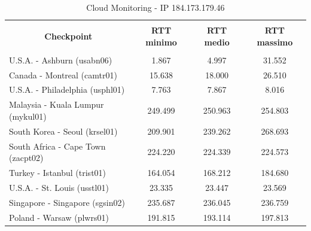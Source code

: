 \documentclass[a4paper,11pt]{book}
\begin{document}
\begin{table}[!ht]
\caption{Cloud Monitoring - IP 184.173.179.46}\label{table:Monitoring_3}
\begin{tabular}{|l|c|c|c|}
\hline
\multicolumn{1}{|c|}{\textbf{}} & {\textbf{}} & {\textbf{}} & {\textbf{}}\\
\multicolumn{1}{|c|}{\textbf{Checkpoint}} & {\textbf{RTT minimo}} & {\textbf{RTT medio}} & {\textbf{RTT massimo}}\\
\multicolumn{1}{|c|}{\textbf{}} & {\textbf{}} & {\textbf{}} & {\textbf{}}\\
\hline
U.S.A. - Ashburn (usabn06) & 1.867 & 4.997 & 31.552\\
Canada - Montreal (camtr01) & 15.638 & 18.000 & 26.510\\
U.S.A. - Philadelphia (usphl01) & 7.763 & 7.867 & 8.016\\
Malaysia - Kuala Lumpur (mykul01) & 249.499 & 250.963 & 254.803\\
South Korea - Seoul (krsel01) & 209.901 & 239.262 & 268.693\\
South Africa - Cape Town (zacpt02) & 224.220 & 224.339 & 224.573\\
Turkey - Istanbul (trist01) & 164.054 & 168.212 & 184.680\\
U.S.A. - St. Louis (usstl01) & 23.335 & 23.447 & 23.569\\
Singapore - Singapore (sgsin02) & 235.687 & 236.045 & 236.759\\
Poland - Warsaw (plwrs01) & 191.815 & 193.114 & 197.813\\
\hline
\end{tabular}
\end{table}

~
\end{document}
